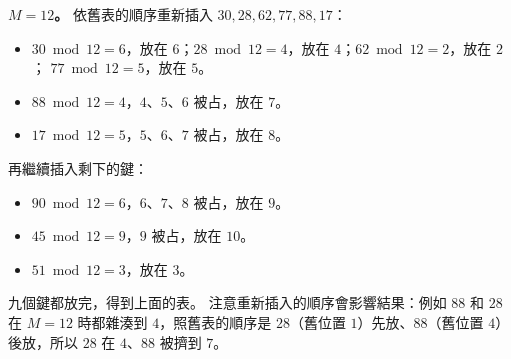 \begin{pastsoln}
\textbf{$M = 12$。} 依舊表的順序重新插入 $30, 28, 62, 77, 88, 17$：
\begin{itemize}
\item $30 \bmod 12 = 6$，放在 $6$；$28 \bmod 12 = 4$，放在 $4$；$62 \bmod 12 = 2$，放在 $2$；
$77 \bmod 12 = 5$，放在 $5$。
\item $88 \bmod 12 = 4$，$4$、$5$、$6$ 被占，放在 $7$。
\item $17 \bmod 12 = 5$，$5$、$6$、$7$ 被占，放在 $8$。
\end{itemize}
再繼續插入剩下的鍵：
\begin{itemize}
\item $90 \bmod 12 = 6$，$6$、$7$、$8$ 被占，放在 $9$。
\item $45 \bmod 12 = 9$，$9$ 被占，放在 $10$。
\item $51 \bmod 12 = 3$，放在 $3$。
\end{itemize}
九個鍵都放完，得到上面的表。 注意重新插入的順序會影響結果：例如 $88$ 和 $28$ 在 $M = 12$ 時都雜湊到
$4$，照舊表的順序是 $28$（舊位置 $1$）先放、$88$（舊位置 $4$）後放，所以 $28$ 在 $4$、$88$ 被擠到 $7$。
\end{pastsoln}
